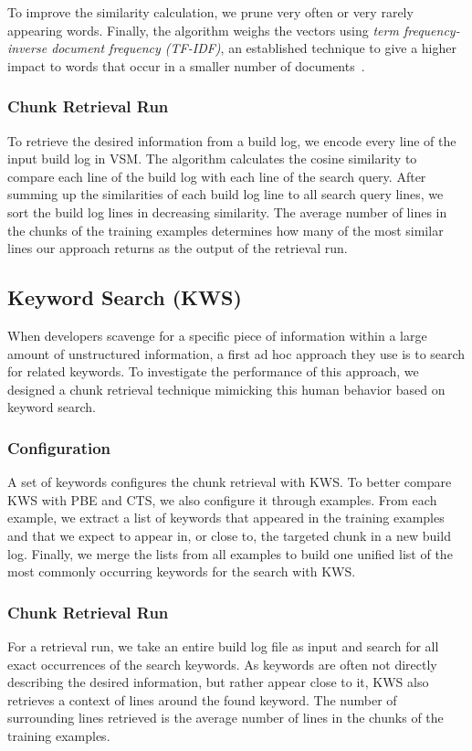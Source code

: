 \documentclass[10pt,journal,compsoc]{IEEEtran}
\begin{document}
To improve the similarity calculation, we prune very often or
very rarely appearing words.
Finally, the
algorithm weighs the vectors using \emph{term frequency-inverse
document frequency (TF-IDF)}, an established technique to give a higher
impact to words that occur in a smaller number of
documents~\cite{lee1997document}.

\subsubsection{Chunk Retrieval Run}
To retrieve the desired information from a build log, we encode every
line of the input build log in VSM.
The algorithm calculates the cosine
similarity to compare each line of the
build log with each line of the search query.
After summing up the
similarities of each build log line to all search query lines, we sort
the build log lines in decreasing similarity.
The average number of
lines in the chunks of the training examples determines how many of
the most similar lines our approach returns as the output of the retrieval
run.

\subsection{Keyword Search (KWS)}
When developers scavenge for a specific piece of information within a
large amount of unstructured information, a first ad hoc approach they
use is to search for related keywords.
To investigate the performance of this approach, we designed a chunk
retrieval technique mimicking this human behavior based on keyword
search.

\subsubsection{Configuration}
A set of keywords configures the chunk retrieval with KWS\@.
To better
compare KWS with PBE and CTS, we also configure it through examples.
From each example, we extract a list of keywords that appeared in the
training examples and that we expect to appear
in, or close to, the targeted chunk in a new build log.
Finally, we merge the lists from all examples to build one unified
list of the most commonly occurring keywords for the search with KWS.

\subsubsection{Chunk Retrieval Run}
For a retrieval run, we take an entire build log file as input and
search for all exact occurrences of the search keywords.
As keywords are
often not directly describing the desired information, but rather
appear close to it, KWS also retrieves a context of lines
around the found keyword.
The number of surrounding lines retrieved is
the average number of lines in the chunks of the training examples.
\end{document}
